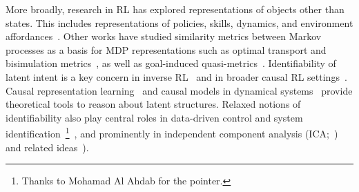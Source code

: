 \documentclass{article}
\theoremstyle{plain}
\theoremstyle{definition}
\theoremstyle{remark}
\begin{document}
More broadly, research in RL has explored representations of objects other than states. This includes representations of policies, skills, dynamics, and environment affordances~\citep{machado2023temporal, choi21variational, khetarpal2020can}. Other works have studied similarity metrics between Markov processes as a basis for MDP representations such as optimal transport and bisimulation metrics~\citep{calo2024bisimulation}, as well as goal-induced quasi-metrics~\citep{wang2023optimal}.
Identifiability of latent intent is a key concern in inverse RL~\citep{rolland2022identifiabilitygeneralizabilitymultipleexperts, kim21reward} and in broader causal RL settings~\citep{zhang2020causal, swamy2022sequence, ruan2024causal}. Causal representation learning~\citep{gamella2025sanitycheckingcausalrepresentation} and causal models in dynamical systems~\citep{peters2020causalmodelsdynamicalsystems} provide theoretical tools to reason about latent structures. Relaxed notions of identifiability also play central roles in data-driven control and system identification~\footnote{Thanks to Mohamad Al Ahdab for the pointer.}~\citep{DBLSCT2025}, and prominently in independent component analysis (ICA;~\citep{comon1994independent}) and related ideas~\citep{gresele2021independent}).
\end{document}
